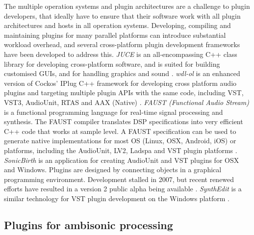 \documentclass{article}
\begin{document}
The multiple operation systems and plugin architectures are a challenge to plugin developers, that ideally have to ensure that their software work with all plugin architectures and hosts in all operation systems.
Developing, compiling and maintaining plugins for many parallel platforms can introduce substantial workload overhead, and several cross-platform plugin development frameworks have been developed to address this.
\emph{JUCE} is an all-encompassing C++ class library for developing cross-platform software, and is suited for building customised GUIs, and for handling graphics and sound \cite{juce2014}.
\emph{wdl-ol} is an enhanced version of Cockos' IPlug C++ framework for developing cross platform audio plugins and targeting multiple plugin APIs with the same code, including VST, VST3, AudioUnit, RTAS and AAX (Native) \cite{larkin2014wdl-ol}.
\emph{FAUST (Functional Audio Stream)} is a functional programming language for real-time signal processing and synthesis.
The FAUST compiler translates DSP specifications into very efficient C++ code that works at sample level.
A FAUST specification can be used to generate native implementations for most OS (Linux, OSX, Android, iOS) or platforms, including the AudioUnit, LV2, Ladspa and VST plugin platforms \cite{smithFaust:2012}.
\emph{SonicBirth} is an application for creating AudioUnit and VST plugins for OSX and Windows.
Plugins are designed by connecting objects in a graphical programming environment. Development stalled in 2007, but recent renewed efforts have resulted in a version 2 public alpha being available \cite{sonicbirth2014}.
\emph{SynthEdit} is a similar technology for VST plugin development on the Windows platform \cite{synthedit2011}.


\subsection{Plugins for ambisonic processing}\label{sec:ambi-plugins}
\end{document}
